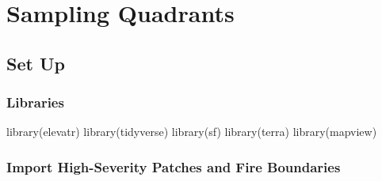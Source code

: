 \documentclass[
]{book}
\newenvironment{Shaded}{\begin{snugshade}}{\end{snugshade}}
\newcommand{\FunctionTok}[1]{\textcolor[rgb]{0.00,0.00,0.00}{#1}}
\newcommand{\NormalTok}[1]{#1}
\begin{document}
\hypertarget{sampling-quadrants}{%
\chapter{Sampling Quadrants}\label{sampling-quadrants}}

\hypertarget{set-up-2}{%
\section{Set Up}\label{set-up-2}}

\hypertarget{libraries-2}{%
\subsection{Libraries}\label{libraries-2}}

\begin{Shaded}
\begin{Highlighting}[]
\FunctionTok{library}\NormalTok{(elevatr)}
\FunctionTok{library}\NormalTok{(tidyverse)}
\FunctionTok{library}\NormalTok{(sf)}
\FunctionTok{library}\NormalTok{(terra)}
\FunctionTok{library}\NormalTok{(mapview)}
\end{Highlighting}
\end{Shaded}

\hypertarget{import-high-severity-patches-and-fire-boundaries}{%
\subsection{Import High-Severity Patches and Fire Boundaries}\label{import-high-severity-patches-and-fire-boundaries}}
\end{document}
